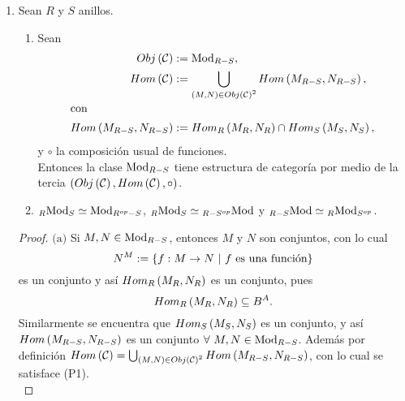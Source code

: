 \documentclass{article}
\begin{document}
\begin{enumerate}[label=\textbf{Ej \arabic*.}]
\begin{proof}
			Entonces $\cdot$ es una acción a izquierda de $R$-módulos.\\
			
			Por el ejercicio 8, se tiene que si $M$ y $N$ son $R$-módulos derechos entonces son $R^{op}$ módulos izquierdos.Asi
			$\cdot$ es  una acción para $Hom_{R^{op}}(M,N)$ y por el ejercicio 8, $\cdot^{op}$ es una acción que vuelve a 
			$Hom_R(M,N)$ un módulo derecho.\\
		\end{proof}
		
		\item Sean $R$ y $S$ anillos.
		\begin{enumerate}[label=(\alph*)]
			\item Sean 
			\begin{align*}
				Obj\lrprth{\mathcal{C}}&:=\ringbimod{R}{S}{\text{Mod}}{r},\\
				Hom\lrprth{\mathcal{C}}&:=\bigcup_{\lrprth{M,N}\in Obj\lrprth{\mathcal{C}}^2}Hom\lrprth{\ringbimod{R}{S}{M}{r},\ringbimod{R}{S}{N}{r}},\\
				\intertext{con}
				Hom\lrprth{\ringbimod{R}{S}{M}{r},\ringbimod{R}{S}{N}{r}}&:=Hom_R\lrprth{\ringmod{R}{M}{r},\ringmod{R}{N}{r}}\cap Hom_S\lrprth{\ringmod{S}{M}{r},\ringmod{S}{N}{r}},
			\end{align*}
			y $\circ$ la composición usual de funciones.\\ Entonces la clase $\ringbimod{R}{S}{\text{Mod}}{r}$ tiene estructura de categoría por medio de la tercia $\left(Obj\left(\mathcal{C}\right),Hom\left(\mathcal{C}\right),\circ\right)$.
			\item $\ringbimod{R}{S}{\text{Mod}}{lr}\simeq\ringbimod{\opst{R}}{S}{\text{Mod}}{r}$, $\ringbimod{R}{S}{\text{Mod}}{lr}\simeq\ringbimod{R}{\opst{S}}{\text{Mod}}{l}$ y $\ringbimod{R}{S}{\text{Mod}}{l}\simeq\ringbimod{R}{\opst{S}}{\text{Mod}}{lr}$.
		\end{enumerate}
		\begin{proof}
			$\boxed{\text{(a)}}$ Si $M,N\in\ringbimod{R}{S}{\text{Mod}}{r}$, entonces $M$ y $N$ son conjuntos, con lo cual 
			\begin{equation*}
				N^M:=\left\{f:M\rightarrow N\ |\ f\text{ es una función}\right\}
			\end{equation*} 
			es un conjunto y así $Hom_{R}\left(M_R,N_R\right)$ es un conjunto, pues $$Hom_{R}\left(M_R,N_R\right)\subseteq B^A.$$
			Similarmente se encuentra que $Hom_{S}\left(M_S,N_S\right)$ es un conjunto, y así $Hom\lrprth{\ringbimod{R}{S}{M}{r},\ringbimod{R}{S}{N}{r}}$ es un conjunto $\forall\ M, N\in\ringbimod{R}{S}{\text{Mod}}{r}$. Además por definición $Hom\lrprth{\mathcal{C}}=\bigcup_{\lrprth{M,N}\in Obj\lrprth{\mathcal{C}}^2}Hom\lrprth{\ringbimod{R}{S}{M}{r},\ringbimod{R}{S}{N}{r}}$, con lo cual se satisface (P1).\\

\end{proof}
\end{enumerate}
\end{document}
